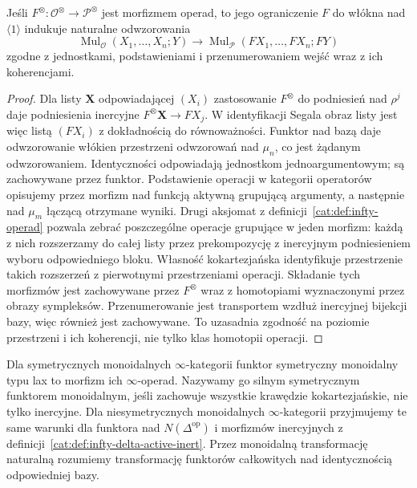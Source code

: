 \begin{stwierdzenie}\label{cat:prop:infty-operad-morphism-mul}
Jeśli $F^\otimes:\mathcal O^\otimes\to\mathcal P^\otimes$ jest morfizmem operad, to jego ograniczenie $F$ do włókna nad $\langle1\rangle$ indukuje naturalne odwzorowania
\[
 \operatorname{Mul}_{\mathcal O}(X_1,\ldots,X_n;Y)
 \longrightarrow
 \operatorname{Mul}_{\mathcal P}(FX_1,\ldots,FX_n;FY)
\]
zgodne z jednostkami, podstawieniami i przenumerowaniem wejść wraz z ich koherencjami.
\end{stwierdzenie}
\begin{proof}
Dla listy $\mathbf X$ odpowiadającej $(X_i)$ zastosowanie $F^\otimes$ do podniesień nad $\rho^j$ daje podniesienia inercyjne $F^\otimes\mathbf X\to FX_j$. W identyfikacji Segala obraz listy jest więc listą $(FX_i)$ z dokładnością do równoważności. Funktor nad bazą daje odwzorowanie włókien przestrzeni odwzorowań nad $\mu_n$, co jest żądanym odwzorowaniem. Identyczności odpowiadają jednostkom jednoargumentowym; są zachowywane przez funktor. Podstawienie operacji w kategorii operatorów opisujemy przez morfizm nad funkcją aktywną grupującą argumenty, a następnie nad $\mu_m$ łączącą otrzymane wyniki. Drugi aksjomat z definicji~\ref{cat:def:infty-operad} pozwala zebrać poszczególne operacje grupujące w jeden morfizm: każdą z nich rozszerzamy do całej listy przez prekompozycję z inercyjnym podniesieniem wyboru odpowiedniego bloku. Własność kokartezjańska identyfikuje przestrzenie takich rozszerzeń z pierwotnymi przestrzeniami operacji. Składanie tych morfizmów jest zachowywane przez $F^\otimes$ wraz z homotopiami wyznaczonymi przez obrazy sympleksów. Przenumerowanie jest transportem wzdłuż inercyjnej bijekcji bazy, więc również jest zachowywane. To uzasadnia zgodność na poziomie przestrzeni i ich koherencji, nie tylko klas homotopii operacji.
\end{proof}

\begin{definicja}\label{cat:def:infty-lax-monoidal}
Dla symetrycznych monoidalnych $\infty$-kategorii funktor symetryczny monoidalny typu lax to morfizm ich $\infty$-operad. Nazywamy go silnym symetrycznym funktorem monoidalnym, jeśli zachowuje wszystkie krawędzie kokartezjańskie, nie tylko inercyjne. Dla niesymetrycznych monoidalnych $\infty$-kategorii przyjmujemy te same warunki dla funktora nad $N(\Delta^{\mathrm{op}})$ i morfizmów inercyjnych z definicji~\ref{cat:def:infty-delta-active-inert}. Przez monoidalną transformację naturalną rozumiemy transformację funktorów całkowitych nad identycznością odpowiedniej bazy.
\end{definicja}

